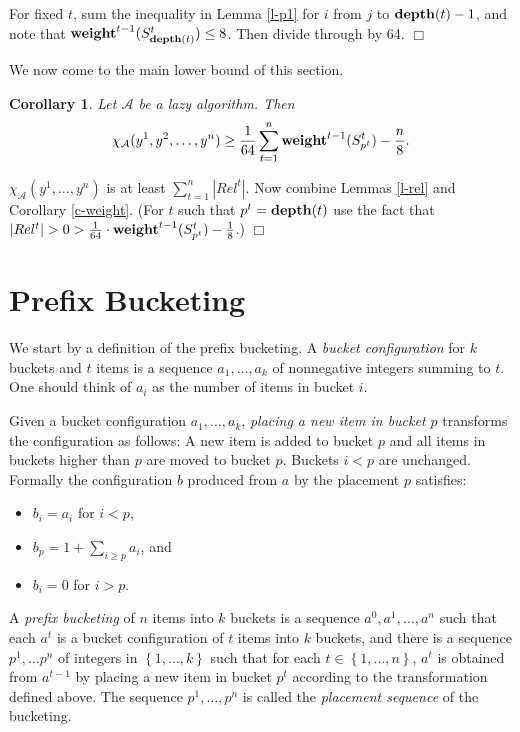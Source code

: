 \documentclass[11pt]{article}
\newtheorem{corollary}[theorem]{Corollary}
\newcommand{\qed}{$\Box$}
\newenvironment{proof}{\noindent {\bf Proof:}}{\hfill \qed \smallskip}
\newcommand{\A}{\mathcal{A}}
\newcommand{\natInt}[2]{ \left\{ #1, \dotsc, #2 \right\} }
\newcommand{\weight}{{\rm {\bf weight}}}
\newcommand{\depth}{{\rm {\bf depth}}}
\begin{document}
\begin{proof}
For fixed $t$, sum the inequality in Lemma \ref{l-p1} for $i$ from $j$ to $\depth(t)-1$, and note that
$\weight^{t-1}(S^t_{\depth(t)}) \leq 8$.  Then divide through by 64.
\end{proof}


We now come to the main lower bound of this section.


\begin{corollary}\label{c-main}
Let $\A$ be a lazy algorithm. Then 
$$ \chi_\A(y^1,y^2,\dotsc,y^n)  \ge \frac{1}{64} \sum_{t=1}^n \weight^{t-1}(S^t_{p^t}) - \frac{n}{8}.$$
\end{corollary}

\begin{proof}
$\chi_\A(y^1,\ldots,y^n)$ is at least $\sum_{t=1}^n |Rel^t|$.  Now combine Lemmas \ref{l-rel} and Corollary 
\ref{c-weight}. (For $t$ such that $p^t=\depth(t)$ use the fact that $|Rel^t|>0> \frac{1}{64} \cdot \weight^{t-1}(S^t_{p^t}) - \frac{1}{8}$.)
\end{proof}


\section{Prefix Bucketing}
\label{s-pb}

We start by a definition of the prefix bucketing.
A {\em  bucket configuration} for $k$ buckets and $t$ items  is a sequence $a_1,\ldots,a_k$ of nonnegative integers
summing to $t$.  One should think of $a_i$ as the number of items in bucket $i$.

Given a bucket configuration
$a_1,\ldots,a_k$, {\em placing a new item in bucket $p$} transforms  the configuration as follows:
A new item is added to bucket $p$ and all items in buckets higher than $p$ are moved to bucket $p$.
Buckets $i < p$ are unchanged.  Formally the configuration $b$ produced from $a$ by the placement $p$ satisfies:

\begin{itemize}
\item $b_i=a_i$ for $i < p$,
\item $b_p=1+\sum_{i \geq p} a_i$, and
\item $b_i=0$ for $i>p$.
\end{itemize}


A {\em prefix bucketing} of $n$ items into $k$ buckets is a sequence $a^0,a^1,\dotsc,a^n$ such that
each $a^t$ is a bucket configuration of $t$ items into $k$ buckets, and there is a sequence
$p^1,\dots p^n$ of integers in $\natInt{1}{k}$ such that for each $t \in \natInt{1}{n}$,
$a^t$ is obtained from $a^{t-1}$ by placing a new item in bucket $p^t$ according to the transformation
defined above.  The sequence $p^1,\ldots,p^n$ is called the {\em placement sequence} of the bucketing.
\end{document}
